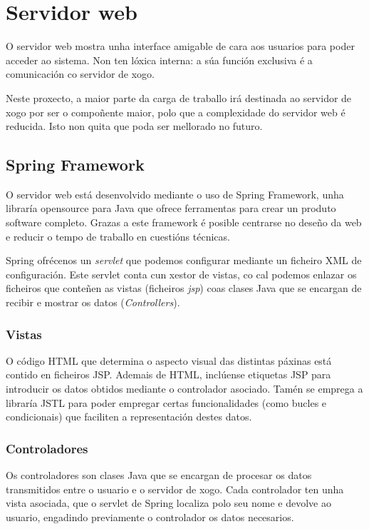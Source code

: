 \section{Servidor web}
O servidor web mostra unha interface amigable de cara aos usuarios para poder
acceder ao sistema. Non ten lóxica interna: a súa función exclusiva é a 
comunicación co servidor de xogo.
\par
Neste proxecto, a maior parte da carga de traballo irá destinada ao servidor de
xogo por ser o compoñente maior, polo que a complexidade do servidor web é
reducida. Isto non quita que poda ser mellorado no futuro.

\subsection{Spring Framework}
O servidor web está desenvolvido mediante o uso de Spring Framework, unha
libraría opensource para Java que ofrece ferramentas para crear un produto
software completo. Grazas a este framework é posible centrarse no deseño da web
e reducir o tempo de traballo en cuestións técnicas.
\par
Spring ofrécenos un {\it servlet} que podemos configurar mediante un ficheiro
XML de configuración. Este servlet conta cun xestor de vistas, co cal podemos
enlazar os ficheiros que conteñen as vistas (ficheiros {\it jsp}) coas clases
Java que se encargan de recibir e mostrar os datos ({\it Controllers}).

\subsubsection{Vistas}
O código HTML que determina o aspecto visual das distintas páxinas está contido
en ficheiros JSP. Ademais de HTML, inclúense etiquetas JSP para introducir os
datos obtidos mediante o controlador asociado. Tamén se emprega a libraría JSTL
para poder empregar certas funcionalidades (como bucles e condicionais) que
faciliten a representación destes datos.

\subsubsection{Controladores}
Os controladores son clases Java que se encargan de procesar os datos
transmitidos entre o usuario e o servidor de xogo. Cada controlador ten unha
vista asociada, que o servlet de Spring localiza polo seu nome e devolve ao
usuario, engadindo previamente o controlador os datos necesarios.

